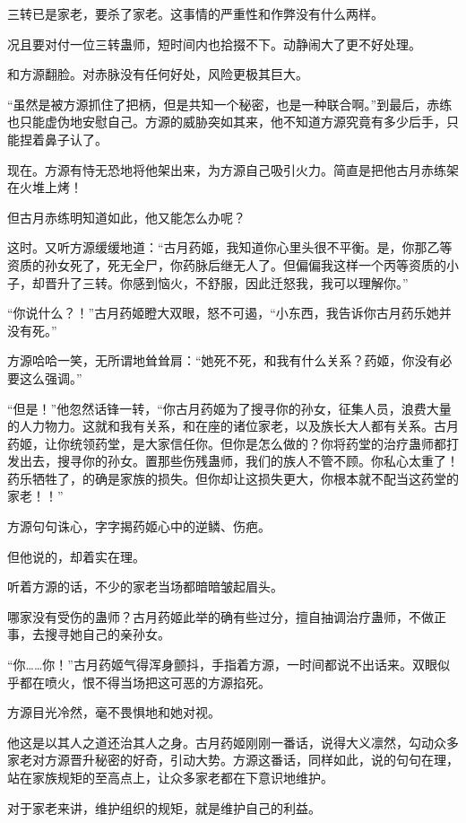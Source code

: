 \begin{this_body}
三转已是家老，要杀了家老。这事情的严重性和作弊没有什么两样。

况且要对付一位三转蛊师，短时间内也拾掇不下。动静闹大了更不好处理。

和方源翻脸。对赤脉没有任何好处，风险更极其巨大。

“虽然是被方源抓住了把柄，但是共知一个秘密，也是一种联合啊。”到最后，赤练也只能虚伪地安慰自己。方源的威胁突如其来，他不知道方源究竟有多少后手，只能捏着鼻子认了。

现在。方源有恃无恐地将他架出来，为方源自己吸引火力。简直是把他古月赤练架在火堆上烤！

但古月赤练明知道如此，他又能怎么办呢？

这时。又听方源缓缓地道：“古月药姬，我知道你心里头很不平衡。是，你那乙等资质的孙女死了，死无全尸，你药脉后继无人了。但偏偏我这样一个丙等资质的小子，却晋升了三转。你感到恼火，不舒服，因此迁怒我，我可以理解你。”

“你说什么？！”古月药姬瞪大双眼，怒不可遏，“小东西，我告诉你古月药乐她并没有死。”

方源哈哈一笑，无所谓地耸耸肩：“她死不死，和我有什么关系？药姬，你没有必要这么强调。”

“但是！”他忽然话锋一转，“你古月药姬为了搜寻你的孙女，征集人员，浪费大量的人力物力。这就和我有关系，和在座的诸位家老，以及族长大人都有关系。古月药姬，让你统领药堂，是大家信任你。但你是怎么做的？你将药堂的治疗蛊师都打发出去，搜寻你的孙女。置那些伤残蛊师，我们的族人不管不顾。你私心太重了！药乐牺牲了，的确是家族的损失。但你却让这损失更大，你根本就不配当这药堂的家老！！”

方源句句诛心，字字揭药姬心中的逆鳞、伤疤。

但他说的，却着实在理。

听着方源的话，不少的家老当场都暗暗皱起眉头。

哪家没有受伤的蛊师？古月药姬此举的确有些过分，擅自抽调治疗蛊师，不做正事，去搜寻她自己的亲孙女。

“你……你！”古月药姬气得浑身颤抖，手指着方源，一时间都说不出话来。双眼似乎都在喷火，恨不得当场把这可恶的方源掐死。

方源目光冷然，毫不畏惧地和她对视。

他这是以其人之道还治其人之身。古月药姬刚刚一番话，说得大义凛然，勾动众多家老对方源晋升秘密的好奇，引动大势。方源这番话，同样如此，说的句句在理，站在家族规矩的至高点上，让众多家老都在下意识地维护。

对于家老来讲，维护组织的规矩，就是维护自己的利益。


\end{this_body}
